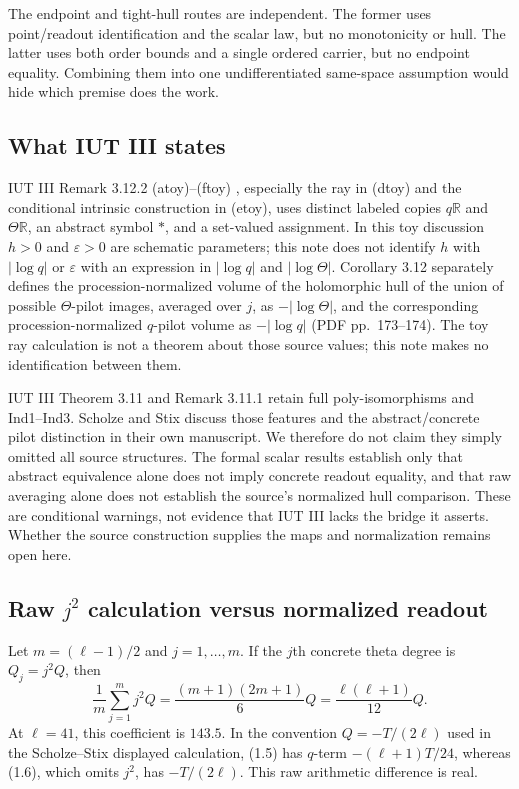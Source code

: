 \documentclass[11pt]{article}
\begin{document}
The endpoint and tight-hull routes are independent. The former uses point/readout identification and the scalar law, but no monotonicity or hull. The latter uses both order bounds and a single ordered carrier, but no endpoint equality. Combining them into one undifferentiated same-space assumption would hide which premise does the work.

\subsection{What IUT III states}
IUT III Remark 3.12.2 (atoy)--(ftoy) \cite[Remark 3.12.2 (atoy)--(ftoy), pp.~190--191]{MochizukiIUTIII}, especially the ray in (dtoy) and the conditional intrinsic construction in (etoy), uses distinct labeled copies $q\mathbb R$ and $\Theta\mathbb R$, an abstract symbol $*$, and a set-valued assignment. In this toy discussion $h>0$ and $\varepsilon>0$ are schematic parameters; this note does not identify $h$ with $|\log q|$ or $\varepsilon$ with an expression in $|\log q|$ and $|\log\Theta|$. Corollary 3.12 separately defines the procession-normalized volume of the holomorphic hull of the union of possible $\Theta$-pilot images, averaged over $j$, as $-|\log\Theta|$, and the corresponding procession-normalized $q$-pilot volume as $-|\log q|$ (PDF pp.~173--174). The toy ray calculation is not a theorem about those source values; this note makes no identification between them.

IUT III Theorem 3.11 and Remark 3.11.1 \cite{MochizukiIUTIII} retain full poly-isomorphisms and Ind1--Ind3. Scholze and Stix discuss those features and the abstract/concrete pilot distinction in their own manuscript. We therefore do not claim they simply omitted all source structures. The formal scalar results establish only that abstract equivalence alone does not imply concrete readout equality, and that raw averaging alone does not establish the source's normalized hull comparison. These are conditional warnings, not evidence that IUT III lacks the bridge it asserts. Whether the source construction supplies the maps and normalization remains open here.

\subsection{Raw $j^2$ calculation versus normalized readout}
Let $m=(\ell-1)/2$ and $j=1,\ldots,m$. If the $j$th concrete theta degree is $Q_j=j^2Q$, then
\[\frac1m\sum_{j=1}^m j^2Q=\frac{(m+1)(2m+1)}6Q=\frac{\ell(\ell+1)}{12}Q.\]
At $\ell=41$, this coefficient is $143.5$. In the convention $Q=-T/(2\ell)$ used in the Scholze--Stix displayed calculation, (1.5) has $q$-term $-(\ell+1)T/24$, whereas (1.6), which omits $j^2$, has $-T/(2\ell)$. This raw arithmetic difference is real.
\end{document}
